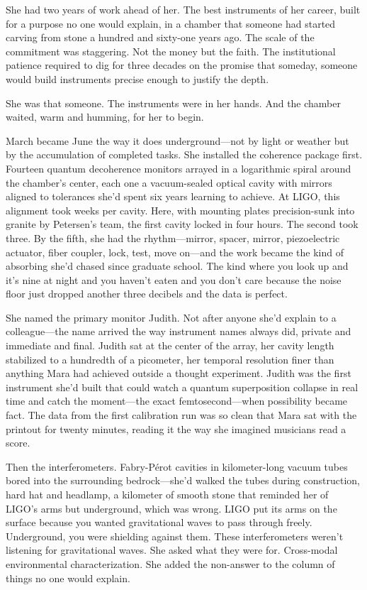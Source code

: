She had two years of work ahead of her. The best instruments of her career, built for a purpose no one would explain, in a chamber that someone had started carving from stone a hundred and sixty-one years ago. The scale of the commitment was staggering. Not the money but the faith. The institutional patience required to dig for three decades on the promise that someday, someone would build instruments precise enough to justify the depth.

She was that someone. The instruments were in her hands. And the chamber waited, warm and humming, for her to begin.

\scenebreak

March became June the way it does underground---not by light or weather but by the accumulation of completed tasks. She installed the coherence package first. Fourteen quantum decoherence monitors arrayed in a logarithmic spiral around the chamber's center, each one a vacuum-sealed optical cavity with mirrors aligned to tolerances she'd spent six years learning to achieve. At LIGO, this alignment took weeks per cavity. Here, with mounting plates precision-sunk into granite by Petersen's team, the first cavity locked in four hours. The second took three. By the fifth, she had the rhythm---mirror, spacer, mirror, piezoelectric actuator, fiber coupler, lock, test, move on---and the work became the kind of absorbing she'd chased since graduate school. The kind where you look up and it's nine at night and you haven't eaten and you don't care because the noise floor just dropped another three decibels and the data is perfect.

She named the primary monitor Judith. Not after anyone she'd explain to a colleague---the name arrived the way instrument names always did, private and immediate and final. Judith sat at the center of the array, her cavity length stabilized to a hundredth of a picometer, her temporal resolution finer than anything Mara had achieved outside a thought experiment. Judith was the first instrument she'd built that could watch a quantum superposition collapse in real time and catch the moment---the exact femtosecond---when possibility became fact. The data from the first calibration run was so clean that Mara sat with the printout for twenty minutes, reading it the way she imagined musicians read a score.

Then the interferometers. Fabry-P\'{e}rot cavities in kilometer-long vacuum tubes bored into the surrounding bedrock---she'd walked the tubes during construction, hard hat and headlamp, a kilometer of smooth stone that reminded her of LIGO's arms but underground, which was wrong. LIGO put its arms on the surface because you wanted gravitational waves to pass through freely. Underground, you were shielding against them. These interferometers weren't listening for gravitational waves. She asked what they were for. Cross-modal environmental characterization. She added the non-answer to the column of things no one would explain.

